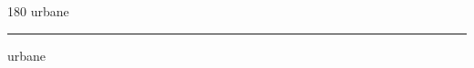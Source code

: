 
\begin{frame}
\begin{center}
\begin{turn}{180}
{\fontsize{2.5cm}{1em}\selectfont urbane}
\end{turn}
\vspace{1em}\par  
\hrule
\vspace{1em}\par  
{\fontsize{2.5cm}{1em}\selectfont urbane}
\end{center}
\end{frame}
